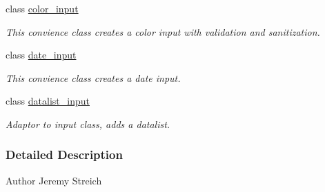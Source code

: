 \begin{DoxyCompactItemize}
class \hyperlink{classcolor__input}{color\-\_\-input}
\begin{DoxyCompactList}\small\item\em This convience class creates a color input with validation and sanitization. \end{DoxyCompactList}\item 
class \hyperlink{classdate__input}{date\-\_\-input}
\begin{DoxyCompactList}\small\item\em This convience class creates a date input. \end{DoxyCompactList}\item 
class \hyperlink{classdatalist__input}{datalist\-\_\-input}
\begin{DoxyCompactList}\small\item\em Adaptor to input class, adds a datalist. \end{DoxyCompactList}\end{DoxyCompactItemize}


\subsubsection{Detailed Description}
\begin{DoxyAuthor}{Author}
Jeremy Streich 
\end{DoxyAuthor}
